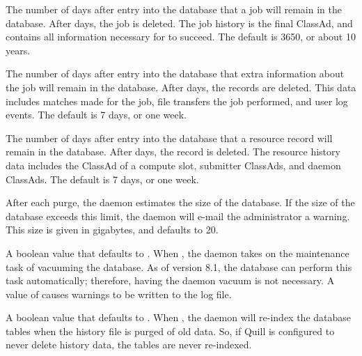 \begin{description}
\label{param:QuillJobHistoryDuration}
\item[\Macro{QUILL\_JOB\_HISTORY\_DURATION}]
  The number of days after entry into the database that a job will
  remain in the database.
  After  days, the job is deleted.
  The job history is the final ClassAd, and contains all information 
  necessary for  to succeed.
  The default is 3650, or about 10 years. 

\label{param:QuillRunHistoryDuration}
\item[\Macro{QUILL\_RUN\_HISTORY\_DURATION}]
  The number of days after entry into the database that extra information 
  about the job will remain in the database.
  After  days, the records are deleted.
  This data includes matches made for the job, file transfers the job 
  performed, and user log events.
  The default is 7 days, or one week. 

\label{param:QuillResourceHistoryDuration}
\item[\Macro{QUILL\_RESOURCE\_HISTORY\_DURATION}]
  The number of days after entry into the database that a resource record will
  remain in the database.
  After  days, the record is 
  deleted.
  The resource history data includes the ClassAd of a compute slot,
  submitter ClassAds, and daemon ClassAds.
  The default is 7 days, or one week. 

\label{param:QuillDBSizeLimit}
\item[\Macro{QUILL\_DBSIZE\_LIMIT}]
  After each purge, the  daemon estimates 
  the size of the database. 
  If the size of the database exceeds this limit, 
  the  daemon will e-mail the administrator a warning. 
  This size is given in gigabytes, and defaults to 20. 

\label{param:QuillManageVacuum}
\item[\Macro{QUILL\_MANAGE\_VACUUM}]
  A boolean value that defaults to .
  When , the  daemon takes on 
  the maintenance task of vacuuming the database.
  As of  version 8.1, the database
  can perform this task automatically; 
  therefore, having the  daemon vacuum is not necessary.
  A value of  causes warnings to be written to the log file.

\label{param:QuillShouldReindex}
\item[\Macro{QUILL\_SHOULD\_REINDEX}]
  A boolean value that defaults to .
  When , the  daemon will re-index the database
  tables when the history file is purged of old data. So, if Quill is
  configured to never delete history data, the tables are never re-indexed.


\end{description}
